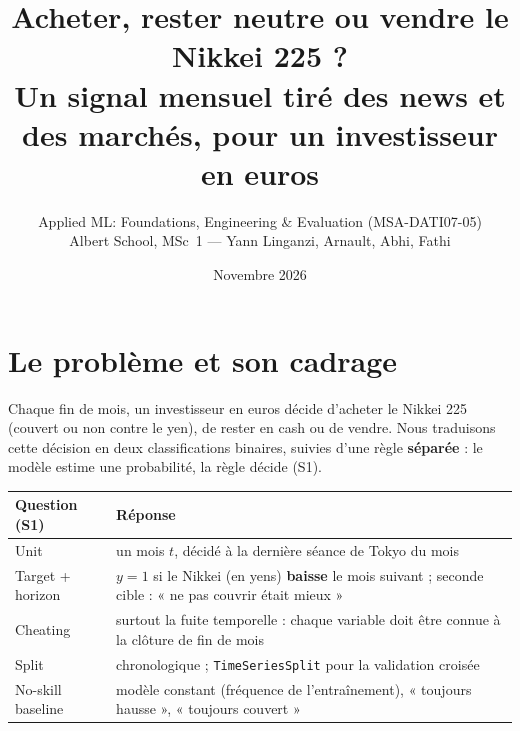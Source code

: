 \documentclass[11pt,a4paper]{article}
\title{\textbf{Acheter, rester neutre ou vendre le Nikkei 225 ?}\\[2pt]
\large Un signal mensuel tiré des news et des marchés, pour un investisseur en euros}
\author{Applied ML: Foundations, Engineering \& Evaluation (MSA-DATI07-05)\\ Albert School, MSc~1 --- Yann Linganzi, Arnault, Abhi, Fathi}
\date{Novembre 2026}
\begin{document}
\maketitle

\noindent{}

\section{Le problème et son cadrage}

Chaque fin de mois, un investisseur en euros décide d'acheter le Nikkei 225 (couvert ou non contre le yen), de rester
en cash ou de vendre. Nous traduisons cette décision en deux classifications binaires, suivies d'une règle
\textbf{séparée} : le modèle estime une probabilité, la règle décide (S1).

\begin{table}[H]\centering\small
\begin{tabular}{p{3.2cm}p{12cm}}\toprule
Question (S1) & Réponse \\\midrule
Unit & un mois $t$, décidé à la dernière séance de Tokyo du mois \\
Target + horizon & $y=1$ si le Nikkei (en yens) \textbf{baisse} le mois suivant ; seconde cible : « ne pas couvrir était mieux » \\
Cheating & surtout la fuite temporelle : chaque variable doit être connue à la clôture de fin de mois \\
Split & chronologique ; \texttt{TimeSeriesSplit} pour la validation croisée \\
No-skill baseline & modèle constant (fréquence de l'entraînement), « toujours hausse », « toujours couvert » \\\bottomrule
\end{tabular}\end{table}
\end{document}
